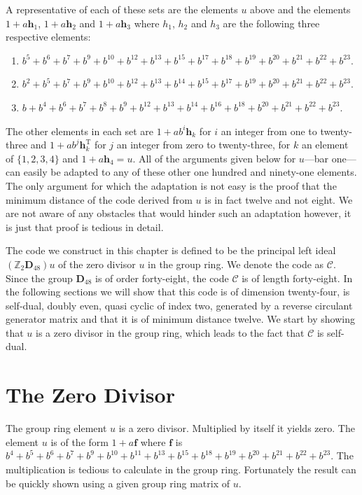 A representative of each of these sets are the elements $u$ above and the elements $1+a \mathbf{h}_1$, $1+a \mathbf{h}_2$ and $1+a \mathbf{h}_3$ where $h_1$, $h_2$ and $h_3$ are the following three respective elements:
\begin{enumerate}
	\item $b^5+b^6+b^7+b^9+b^{10}+b^{12}+b^{13}+b^{15}+b^{17}+b^{18}+b^{19}+b^{20}+b^{21}+b^{22}+b^{23}$.
	\item $b^2 + b^5 + b^7 + b^9 + b^{10} + b^{12} + b^{13} + b^{14} + b^{15} + b^{17} + b^{19} + b^{20} + b^{21} + b^{22} + b^{23}$.
	\item $b + b^4 + b^6 + b^7 + b^8 + b^9 + b^{12} + b^{13} + b^{14} + b^{16} + b^{18} + b^{20} + b^{21} + b^{22} + b^{23}$.
\end{enumerate}
The other elements in each set are $1 + a b^i \mathbf{h}_k$ for $i$ an integer from one to twenty-three and $1 + a b^j \mathbf{h}_k^{\textrm{T}}$ for $j$ an integer from zero to twenty-three, for $k$ an element of $\{1,2,3,4\}$ and $1 + a \mathbf{h}_4 = u$.
All of the arguments given below for $u$---bar one---can easily be adapted to any of these other one hundred and ninety-one elements.
The only argument for which the adaptation is not easy is the proof that the minimum distance of the code derived from $u$ is in fact twelve and not eight.
We are not aware of any obstacles that would hinder such an adaptation however, it is just that proof is tedious in detail.

The code we construct in this chapter is defined to be the principal left ideal $( \mathbb{Z}_2 \mathbf{D}_{48}) u$ of the zero divisor $u$ in the group ring.
We denote the code as $\mathcal{C}$.
Since the group $\mathbf{D}_{48}$ is of order forty-eight, the code $\mathcal{C}$ is of length forty-eight.
In the following sections we will show that this code is of dimension twenty-four, is self-dual, doubly even, quasi cyclic of index two, generated by a reverse circulant generator matrix and that it is of minimum distance twelve.
We start by showing that $u$ is a zero divisor in the group ring, which leads to the fact that $\mathcal{C}$ is self-dual.

\section{The Zero Divisor}
\label{sect:482412zerodiv}
The group ring element $u$ is a zero divisor.
Multiplied by itself it yields zero.
The element $u$ is of the form $1+a \mathbf{f}$ where $\mathbf{f}$ is $b^4 + b^5 + b^6 + b^7 + b^9 + b^{10} + b^{11} + b^{13} + b^{15} + b^{18} + b^{19} + b^{20} + b^{21} + b^{22} + b^{23}$.
The multiplication is tedious to calculate in the group ring.
Fortunately the result can be quickly shown using a given group ring matrix of $u$.

